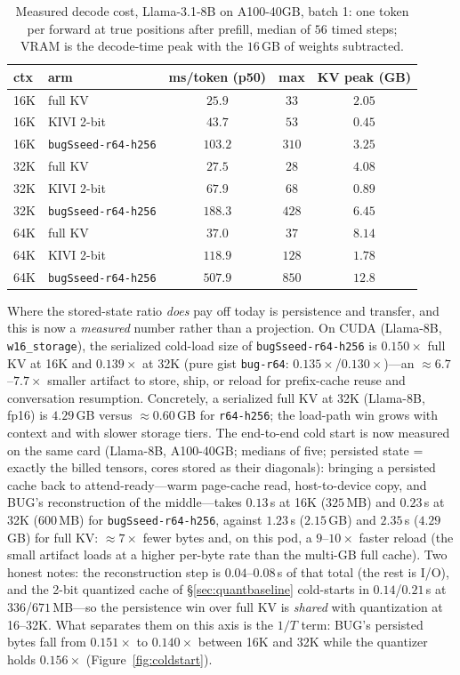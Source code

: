\documentclass[11pt]{article}
\begin{document}
\begin{table}[t]
\centering
\caption{Measured decode cost, Llama-3.1-8B on A100-40GB, batch 1: one token per
forward at true positions after prefill, median of $56$ timed steps; VRAM is the
decode-time peak with the $16$\,GB of weights subtracted.}
\label{tab:latency}
\small
\begin{tabular}{llccc}
\toprule
ctx & arm & ms/token (p50) & max & KV peak (GB) \\
\midrule
16K & full KV & $25.9$ & $33$ & $2.05$ \\
16K & KIVI 2-bit & $43.7$ & $53$ & $0.45$ \\
16K & \texttt{bugSseed-r64-h256} & $103.2$ & $310$ & $3.25$ \\
32K & full KV & $27.5$ & $28$ & $4.08$ \\
32K & KIVI 2-bit & $67.9$ & $68$ & $0.89$ \\
32K & \texttt{bugSseed-r64-h256} & $188.3$ & $428$ & $6.45$ \\
64K & full KV & $37.0$ & $37$ & $8.14$ \\
64K & KIVI 2-bit & $118.9$ & $128$ & $1.78$ \\
64K & \texttt{bugSseed-r64-h256} & $507.9$ & $850$ & $12.8$ \\
\bottomrule
\end{tabular}
\end{table}

Where the stored-state ratio \emph{does} pay off today is persistence and
transfer, and this is now a \emph{measured} number rather than a projection.
On CUDA (Llama-8B, \texttt{w16\_storage}), the serialized cold-load size of
\texttt{bugSseed-r64-h256} is $0.150\times$ full KV at 16K and $0.139\times$ at
32K (pure gist \texttt{bug-r64}: $0.135\times$/$0.130\times$)---an $\approx
6.7$--$7.7\times$ smaller artifact to store, ship, or reload for prefix-cache
reuse and conversation resumption. Concretely, a serialized full KV at 32K
(Llama-8B, fp16) is $4.29$\,GB versus $\approx0.60$\,GB for \texttt{r64-h256};
the load-path win grows with context and with slower storage tiers. The
end-to-end cold start is now measured on the same card (Llama-8B, A100-40GB;
medians of five; persisted state = exactly the billed tensors, cores stored as
their diagonals): bringing a persisted cache back to attend-ready---warm page-cache read,
host-to-device copy, and BUG's reconstruction of the middle---takes
$\mathbf{0.13}$\,s at 16K ($325$\,MB) and $\mathbf{0.23}$\,s at 32K ($600$\,MB)
for \texttt{bugSseed-r64-h256}, against $1.23$\,s ($2.15$\,GB) and $2.35$\,s
($4.29$\,GB) for full KV: $\approx7\times$ fewer bytes and, on this pod, a
$9$--$10\times$ faster reload (the small artifact loads at a higher per-byte rate
than the multi-GB full cache). Two honest notes:
the reconstruction step is $0.04$--$0.08$\,s of that total (the rest is I/O), and
the 2-bit quantized cache of \S\ref{sec:quantbaseline} cold-starts in
$0.14$/$0.21$\,s at $336$/$671$\,MB---so the persistence win over full KV is
\emph{shared} with quantization at 16--32K. What separates them on this axis is
the $1/T$ term: BUG's persisted bytes fall from $0.151\times$ to $0.140\times$
between 16K and 32K while the quantizer holds $0.156\times$
(Figure~\ref{fig:coldstart}).
\end{document}
